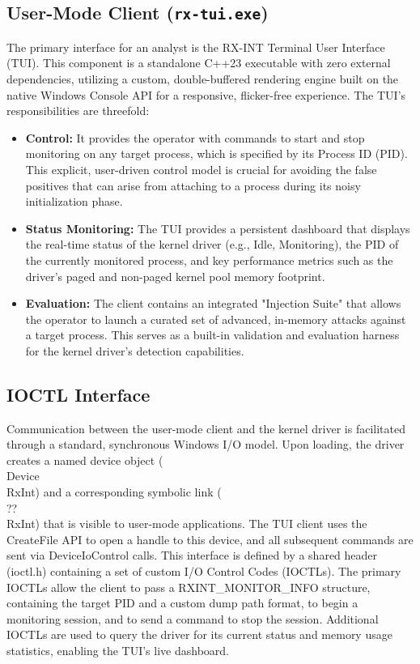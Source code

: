\documentclass[journal]{IEEEtran}
\begin{document}
\subsection{User-Mode Client (\texttt{rx-tui.exe})}
The primary interface for an analyst is the RX-INT Terminal User Interface (TUI). This component is a standalone C++23 executable with zero external dependencies, utilizing a custom, double-buffered rendering engine built on the native Windows Console API for a responsive, flicker-free experience. The TUI's responsibilities are threefold:
\begin{itemize}
\item \textbf{Control:} It provides the operator with commands to start and stop monitoring on any target process, which is specified by its Process ID (PID). This explicit, user-driven control model is crucial for avoiding the false positives that can arise from attaching to a process during its noisy initialization phase.
\item \textbf{Status Monitoring:} The TUI provides a persistent dashboard that displays the real-time status of the kernel driver (e.g., Idle, Monitoring), the PID of the currently monitored process, and key performance metrics such as the driver's paged and non-paged kernel pool memory footprint.
\item \textbf{Evaluation:} The client contains an integrated "Injection Suite" that allows the operator to launch a curated set of advanced, in-memory attacks against a target process. This serves as a built-in validation and evaluation harness for the kernel driver's detection capabilities.
\end{itemize}
\subsection{IOCTL Interface}
Communication between the user-mode client and the kernel driver is facilitated through a standard, synchronous Windows I/O model. Upon loading, the driver creates a named device object (\\Device\\RxInt) and a corresponding symbolic link (\\??\\RxInt) that is visible to user-mode applications. The TUI client uses the CreateFile API to open a handle to this device, and all subsequent commands are sent via DeviceIoControl calls.
This interface is defined by a shared header (ioctl.h) containing a set of custom I/O Control Codes (IOCTLs). The primary IOCTLs allow the client to pass a RXINT_MONITOR_INFO structure, containing the target PID and a custom dump path format, to begin a monitoring session, and to send a command to stop the session. Additional IOCTLs are used to query the driver for its current status and memory usage statistics, enabling the TUI's live dashboard.
\end{document}
